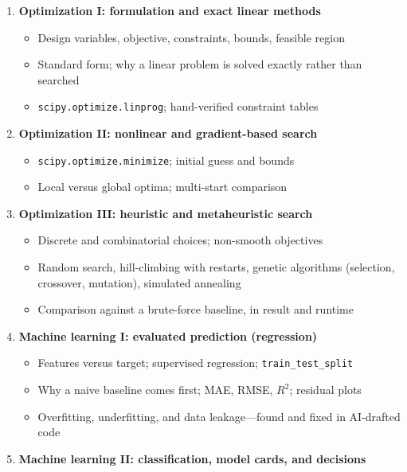 \documentclass[11pt]{article}
\begin{document}
\begin{enumerate}
\begin{itemize}
        \end{itemize}
  \item \textbf{Optimization I: formulation and exact linear methods}
        \begin{itemize}
          \item Design variables, objective, constraints, bounds, feasible region
          \item Standard form; why a linear problem is solved exactly rather than searched
          \item \texttt{scipy.optimize.linprog}; hand-verified constraint tables
        \end{itemize}
  \item \textbf{Optimization II: nonlinear and gradient-based search}
        \begin{itemize}
          \item \texttt{scipy.optimize.minimize}; initial guess and bounds
          \item Local versus global optima; multi-start comparison
        \end{itemize}
  \item \textbf{Optimization III: heuristic and metaheuristic search}
        \begin{itemize}
          \item Discrete and combinatorial choices; non-smooth objectives
          \item Random search, hill-climbing with restarts, genetic algorithms
                (selection, crossover, mutation), simulated annealing
          \item Comparison against a brute-force baseline, in result and runtime
        \end{itemize}
  \item \textbf{Machine learning I: evaluated prediction (regression)}
        \begin{itemize}
          \item Features versus target; supervised regression; \texttt{train\_test\_split}
          \item Why a naive baseline comes first; MAE, RMSE, $R^2$; residual plots
          \item Overfitting, underfitting, and data leakage---found and fixed in AI-drafted code
        \end{itemize}
  \item \textbf{Machine learning II: classification, model cards, and decisions}
        \begin{itemize}

\end{itemize}
\end{enumerate}
\end{document}
